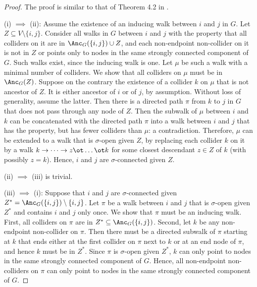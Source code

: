 \begin{proof}
  The proof is similar to that of Theorem 4.2 in \cite{RichardsonSpirtes02}.


  (i) $\implies$ (ii): Assume the existence of an inducing walk between $i$ and $j$ in $G$. 
  Let $Z \subseteq V\setminus\{i,j\}$. 
  Consider all walks in $G$ between $i$ and $j$ with the property that all colliders on it are in $\Anc_{G}({\{i,j\}) \cup Z}$, and each non-endpoint non-collider on it is not in $Z$ or points only to nodes in the same strongly connected component of $G$.
  Such walks exist, since the inducing walk is one. 
  Let $\mu$ be such a walk with a minimal number of colliders.
  We show that all colliders on $\mu$ must be in $\Anc_{G}(Z)$. 
  Suppose on the contrary the existence of a collider $k$ on $\mu$ that is not ancestor of $Z$. 
  It is either ancestor of $i$ or of $j$, by assumption.
  Without loss of generality, assume the latter.
  Then there is a directed path $\pi$ from $k$ to $j$ in $G$ that does not pass through any node of $Z$. 
  Then the subwalk of $\mu$ between $i$ and $k$ can be concatenated with the directed path $\pi$
  into a walk between $i$ and $j$ that has the property, but has fewer colliders than $\mu$: a contradiction. 
  Therefore, $\mu$ can be extended to a walk that is $\sigma$-open given $Z$, by replacing each collider $k$ on
  it by a walk $k \to \dots \to z \ot \dots \ot k$ for some closest descendant $z \in Z$ of $k$ (with possibly $z=k$).
  Hence, $i$ and $j$ are $\sigma$-connected given $Z$.

  (ii) $\implies$ (iii) is trivial.

  (iii) $\implies$ (i): Suppose that %
  $i$ and $j$ are $\sigma$-connected given $Z^* = \Anc_{G}(\{i,j\}) \setminus \{i,j\}$. 
  Let $\pi$ be a walk between $i$ and $j$ that is $\sigma$-open given $Z^*$ and contains $i$ and $j$ only once.
  We show that $\pi$ must be an inducing walk. 
  First, all colliders on $\pi$ are in $Z^* \subseteq \Anc_{G}(\{i,j\})$. 
  Second, let $k$ be any non-endpoint non-collider on $\pi$.
  Then there must be a directed subwalk of $\pi$ starting at $k$ that ends either at the first collider on $\pi$ next to $k$ or at an end node of $\pi$, and hence $k$ must be in $Z^*$. 
  Since $\pi$ is $\sigma$-open given $Z^*$, $k$ can only point to nodes in the same strongly connected component of $G$.
  Hence, all non-endpoint non-colliders on $\pi$ can only point to nodes in the same strongly connected component of $G$.
\end{proof}
